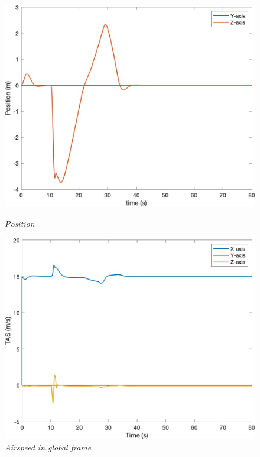 \begin{figure}[htbp]
  \centering
  \begin{minipage}[b]{0.45\textwidth}
    \centering
    \includegraphics[width=\textwidth]{Images/Gust/Gust FWD pulse 0428/1 position_4.jpg}
    \caption*{\textit{Position}}
  \end{minipage}
  \hfil
  \begin{minipage}[b]{0.45\textwidth}
    \centering
    \includegraphics[width=\textwidth]{Images/Gust/Gust FWD pulse 0428/2 TAS_4.jpg}
    \caption*{\textit{Airspeed in global frame}}
  \end{minipage}

\end{figure}
